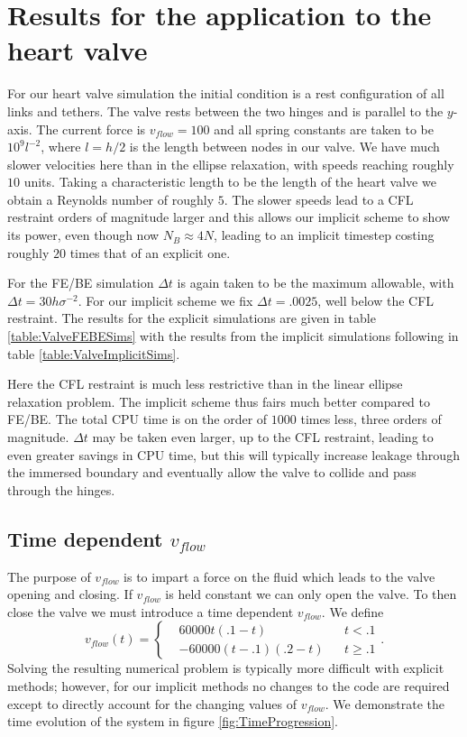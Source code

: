 \documentclass[preprint,12pt]{elsarticle}
\begin{document}
\section{Results for the application to the heart valve}
For our heart valve simulation the initial condition is a rest configuration of all links and tethers. The valve rests between the two hinges and is parallel to the $y$-axis. The current force is $v_{flow}=100$ and all spring constants are taken to be $10^9l^{-2}$, where $l=h/2$ is the length between nodes in our valve. We have much slower velocities here than in the ellipse relaxation, with speeds reaching roughly $10$ units. Taking a characteristic length to be the length of the heart valve we obtain a Reynolds number of roughly $5$. The slower speeds lead to a CFL restraint orders of magnitude larger and this allows our implicit scheme to show its power, even though now $N_B \approx 4N$, leading to an implicit timestep costing roughly $20$ times that of an explicit one.

For the FE/BE simulation $\Delta t$ is again taken to be the maximum allowable, with $\Delta t = 30h\sigma^{-2}$. For our implicit scheme we fix $\Delta t=.0025$, well below the CFL restraint. The results for the explicit simulations are given in table \ref{table:ValveFEBESims} with the results from the implicit simulations following in table \ref{table:ValveImplicitSims}.

Here the CFL restraint is much less restrictive than in the linear ellipse relaxation problem. The implicit scheme thus fairs much better compared to FE/BE. The total CPU time is on the order of $1000$ times less, three orders of magnitude. $\Delta t$ may be taken even larger, up to the CFL restraint, leading to even greater savings in CPU time, but this will typically increase leakage through the immersed boundary and eventually allow the valve to collide and pass through the hinges.

\subsection{Time dependent $v_{flow}$}
The purpose of $v_{flow}$ is to impart a force on the fluid which leads to the valve opening and closing. If $v_{flow}$ is held constant we can only open the valve. To then close the valve we must introduce a time dependent $v_{flow}$.
We define
\begin{equation}
v_{flow}(t) =
\left\{
\begin{array}{cccc}
&60000t(.1-t)& &t<.1 \\
&-60000(t-.1)(.2-t)& &t\geq .1
\end{array}
\right. .
\label{eqn:VariableFlow}
\end{equation}
Solving the resulting numerical problem is typically more difficult with explicit methods; however, for our implicit methods no changes to the code are required except to directly account for the changing values of $v_{flow}$. We demonstrate the time evolution of the system in figure \ref{fig:TimeProgression}.
\end{document}
